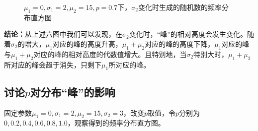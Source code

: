 \documentclass[CJK]{ctexart}
\begin{document}
\begin{figure}[H]
{    }
    \quad
    \quad
    \caption{$\mu_1=0,\sigma_1=2,\mu_2=15,p=0.7$下，$\sigma_2$变化时生成的随机数的频率分布直方图}
    \label{fig4}
\end{figure}

\textbf{结论：}从上述六图中我们可以发现，在$\sigma_2$变化时，“峰”的相对高度会发生变化。随着$\sigma_2$的增大，$\mu_1$对应的峰的高度升高，$\mu_1+\mu_2$对应的峰的高度下降，$\mu_1$对应的峰与$\mu_1+\mu_2$对应的峰的相对高度的代数值增大。且特别地，当$\sigma_2$特别大时，$\mu_1+\mu_2$所对应的峰会趋于消失，只剩下$\mu_1$所对应的峰。

\subsection{讨论$p$对分布“峰”的影响}

固定参数$\mu_1=0,\sigma_1=2,\mu_2=15,\sigma_2=3$，改变$p$取值，令$p$分别为$0, 0.2, 0.4, 0.6, 0.8, 1.0$，观察得到的频率分布直方图。
\end{document}
